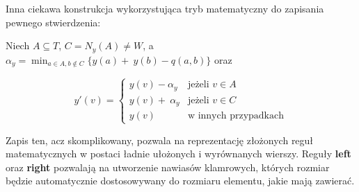 Inna ciekawa konstrukcja wykorzystująca tryb matematyczny do zapisania pewnego stwierdzenia:

Niech $A \subseteq T$, $C = N_y(A) \neq W$, a~$\alpha_y = \min_{a \in A, b\notin C} \{y(a) +~y(b) - q(a, b)\}$ oraz

\[ y'(v) = \left\{ \begin{array}{ll}
                y(v) - \alpha_y & \mbox{jeżeli $v \in A$} \\
                y(v) +~\alpha_y & \mbox{jeżeli $v \in C$} \\
                y(v)            & \mbox{w innych przypadkach}
               \end{array}
       \right. \]

Zapis ten, acz skomplikowany, pozwala na reprezentację złożonych reguł matematycznych w postaci ładnie ułożonych i wyrównanych wierszy. Reguły \textbf{left} oraz \textbf{right} pozwalają na utworzenie nawiasów klamrowych, których rozmiar będzie automatycznie dostosowywany do rozmiaru elementu, jakie mają zawierać.
